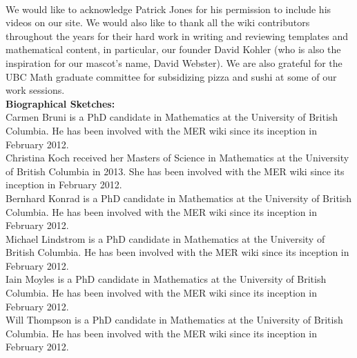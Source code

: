 \documentclass{primus}
\begin{document}
\\[1cm]
\noindent{}We would like to acknowledge Patrick Jones for his permission to include his videos on our site.  We would also like to thank all the wiki contributors throughout the years for their hard work in writing and reviewing templates and mathematical content, in particular, our founder David Kohler (who is also the inspiration for our mascot’s name, David Webster).  We are also grateful for the UBC Math graduate committee for subsidizing pizza and sushi at some of our work sessions.
\\[1cm]
\textbf{Biographical Sketches:}\\
Carmen Bruni is a PhD candidate in Mathematics at the University of British Columbia.  He has been involved with the MER wiki since its inception in February 2012.
\\[0.5cm]
Christina Koch received her Masters of Science in Mathematics at the University of British Columbia in 2013.  She has been involved with the MER wiki since its inception in February 2012.
\\[0.5cm]
Bernhard Konrad is a PhD candidate in Mathematics at the University of British Columbia.  He has been involved with the MER wiki since its inception in February 2012.
\\[0.5cm]
Michael Lindstrom is a PhD candidate in Mathematics at the University of British Columbia.  He has been involved with the MER wiki since its inception in February 2012.
\\[0.5cm]
Iain Moyles is a PhD candidate in Mathematics at the University of British Columbia.  He has been involved with the MER wiki since its inception in February 2012.
\\[0.5cm]
Will Thompson is a PhD candidate in Mathematics at the University of British Columbia.  He has been involved with the MER wiki since its inception in February 2012.
\\[0.5cm]
\end{document}

